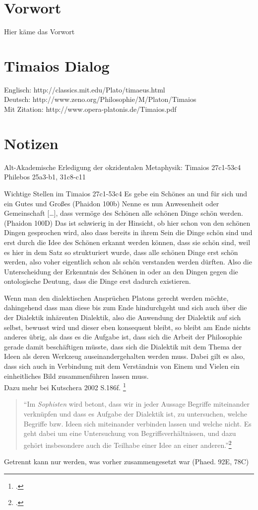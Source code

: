 \documentclass[12pt]{article}
\newcommand*{\zitatblock}[1]{%
    \begin{quote}
    \fontsize{10}{12}\selectfont
    \setlength{\parskip}{1.0em}
    #1
    \end{quote}
}
\begin{document}

\newpage
{}
\section*{Vorwort}
Hier käme das Vorwort
\newpage
\tableofcontents
\newpage
\pagestyle{fancy}
\fancyhf{}
\fancyfoot[R]{\thepage}
\setcounter{page}{1}
\justifying
\section*{Timaios Dialog}
Englisch:   http://classics.mit.edu/Plato/timaeus.html\\
Deutsch:    http://www.zeno.org/Philosophie/M/Platon/Timaios\\
Mit Zitation: http://www.opera-platonis.de/Timaios.pdf


\section*{Notizen}
Alt-Akademische Erledigung der okzidentalen Metaphysik:
Timaios 27c1-53c4 
Philebos 25a3-b1, 31c8-c11

Wichtige Stellen im Timaios 27c1-53c4
Es gebe ein Schönes an und für sich und ein Gutes und Großes (Phaidon 100b)
Nenne es nun Anwesenheit oder Gemeinschaft [\dots], dass vermöge des Schönen alle schönen Dinge schön werden. (Phaidon 100D)
Das ist schwierig in der Hinsicht, ob hier schon von den schönen Dingen gesprochen wird, also dass bereits in ihrem Sein die Dinge schön sind und erst durch die Idee des Schönen erkannt werden können, dass sie schön sind, weil es hier in dem Satz so strukturiert wurde, dass alle schönen Dinge erst schön werden, also voher eigentlich schon als schön verstanden werden dürften. 
Also die Unterscheidung der Erkenntnis des Schönen in oder an den Dingen gegen die ontologische Deutung, dass die Dinge erst dadurch existieren.

Wenn man den dialektischen Ansprüchen Platons gerecht werden möchte, dahingehend dass man diese bis zum Ende hindurchgeht und sich auch über die der Dialektik inhärenten Dialektik, also die Anwendung der Dialektik auf sich selbst, bewusst wird und dieser eben konsequent bleibt, so bleibt am Ende nichts anderes übrig, als dass es die Aufgabe ist, dass sich die Arbeit der Philosophie gerade damit beschäftigen müsste, dass sich die Dialektik mit dem Thema der Ideen als deren Werkzeug auseinandergehalten werden muss. Dabei gilt es also, dass sich auch in Verbindung mit dem Verständnis von Einem und Vielen ein einheitliches Bild zusammenführen lassen muss.\\
Dazu mehr bei Kutschera 2002 S.186f. \footcite[vgl.][S. 186f.]{Kutschera}
\zitatblock{\enquote{Im \emph{Sophisten} wird betont, dass wir in jeder Aussage Begriffe miteinander verknüpfen und dass es Aufgabe der Dialektik ist, zu untersuchen, welche Begriffe bzw. Ideen sich miteinander verbinden lassen und welche nicht. Es geht dabei um eine Untersuchung von Begriffsverhältnissen, und dazu gehört insbesondere auch die Teilhabe einer Idee an einer anderen.}\footcite[][S. 186f.]{Kutschera}}
Getrennt kann nur werden, was vorher zusammengesetzt war (Phaed. 92E, 78C)
\end{document}
